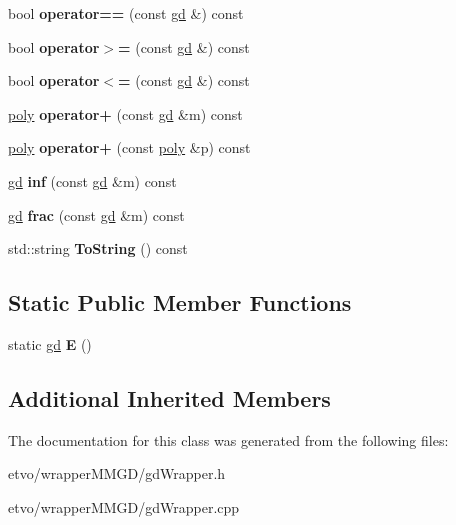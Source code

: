 \begin{DoxyCompactItemize}
bool {\bfseries operator==} (const \mbox{\hyperlink{classetvo_i_i_1_1gd}{gd}} \&) const
\item 
\mbox{\label{classetvo_i_i_1_1gd_af6815832a745521df516a446dc46ca55}} 
bool {\bfseries operator$>$=} (const \mbox{\hyperlink{classetvo_i_i_1_1gd}{gd}} \&) const
\item 
\mbox{\label{classetvo_i_i_1_1gd_a2b082e42795b21d95b9fb3993e3bce0d}} 
bool {\bfseries operator$<$=} (const \mbox{\hyperlink{classetvo_i_i_1_1gd}{gd}} \&) const
\item 
\mbox{\label{classetvo_i_i_1_1gd_abcb521a76cb6f88d843b59794bfc0a08}} 
\mbox{\hyperlink{classetvo_i_i_1_1poly}{poly}} {\bfseries operator+} (const \mbox{\hyperlink{classetvo_i_i_1_1gd}{gd}} \&m) const
\item 
\mbox{\label{classetvo_i_i_1_1gd_a6177b126400a49eed93dc097e695de78}} 
\mbox{\hyperlink{classetvo_i_i_1_1poly}{poly}} {\bfseries operator+} (const \mbox{\hyperlink{classetvo_i_i_1_1poly}{poly}} \&p) const
\item 
\mbox{\label{classetvo_i_i_1_1gd_a22ada16c77209531f30ba2e9c29299bd}} 
\mbox{\hyperlink{classetvo_i_i_1_1gd}{gd}} {\bfseries inf} (const \mbox{\hyperlink{classetvo_i_i_1_1gd}{gd}} \&m) const
\item 
\mbox{\label{classetvo_i_i_1_1gd_acafc3cdada6c4b78a7f08b988820ca34}} 
\mbox{\hyperlink{classetvo_i_i_1_1gd}{gd}} {\bfseries frac} (const \mbox{\hyperlink{classetvo_i_i_1_1gd}{gd}} \&m) const
\item 
\mbox{\label{classetvo_i_i_1_1gd_a501d33b5825ea139f9f9271039f408ff}} 
std\+::string {\bfseries To\+String} () const
\end{DoxyCompactItemize}
\subsection*{Static Public Member Functions}
\begin{DoxyCompactItemize}
\item 
\mbox{\label{classetvo_i_i_1_1gd_a4a0fc6b9c68ab8e30fc515820fdae3db}} 
static \mbox{\hyperlink{classetvo_i_i_1_1gd}{gd}} {\bfseries E} ()
\end{DoxyCompactItemize}
\subsection*{Additional Inherited Members}


The documentation for this class was generated from the following files\+:\begin{DoxyCompactItemize}
\item 
etvo/wrapper\+M\+M\+G\+D/gd\+Wrapper.\+h\item 
etvo/wrapper\+M\+M\+G\+D/gd\+Wrapper.\+cpp\end{DoxyCompactItemize}
